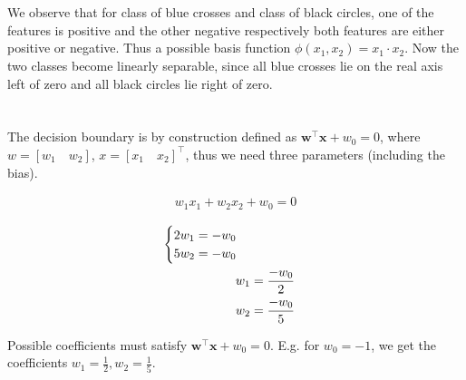 \documentclass[11pt]{article}
\newcommand{\exercise}{\section{}}
\newcommand{\tf}[1]{{#1}^{\intercal}}
\newcommand{\groupf}[2]{%
\begingroup
\begin{cases}
  {#1}  \\
  {#2}
\end{cases}
\endgroup
}
\begin{document}
\exercise

We observe that for class of blue crosses and class of black circles, one of the features is positive and the other negative respectively both features are either positive or negative. Thus a possible basis function $\phi(x_1, x_2) = x_1  \cdot x_2$. Now the two classes become linearly separable, since all blue crosses lie on the real axis left of zero and all black circles lie right of zero. 

\exercise

The decision boundary is by construction defined as $\tf{\textbf{w}} \textbf{x} + w_0 = 0$, where $w = [w_1 \quad w_2]$, $x = \tf{[x_1 \quad x_2]}$, thus we need three parameters (including the bias).

\begin{align*}
w_1 x_1 + w_2 x_2 + w_0 = 0
\end{align*}

\begin{align*}
\groupf{2 w_1 = -w_0}{5 w_2 = -w_0} \\
w_1 &= \frac{-w_0}{2} \\
w_2 &= \frac{-w_0}{5}
\end{align*}

\noindent Possible coefficients must satisfy $\tf{\textbf{w}} \textbf{x} + w_0 = 0$. E.g. for $w_0 = -1$, we get the coefficients $w_1 = \frac{1}{2}, w_2 = \frac{1}{5}$.
\end{document}

